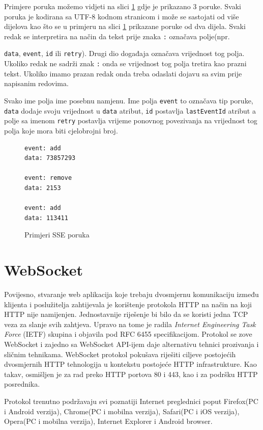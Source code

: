 \documentclass[times, utf8, zavrsni]{fer}
\begin{document}
Primjere poruka možemo vidjeti na slici \ref{lst:sse-messages} gdje je prikazano 3 poruke. Svaki poruka je kodirana sa UTF-8 kodnom stranicom i može se sastojati od više dijelova kao što se u primjeru na slici \ref{lst:sse-messages} prikazane poruke od dva dijela. Svaki redak se interpretira na način da tekst prije znaka {\tt :} označava polje(npr. {{\tt data}, {\tt event}, {\tt id} ili {\tt retry}). Drugi dio događaja označava vrijednost tog polja. Ukoliko redak ne sadrži znak {\tt :} onda se vrijednost tog polja tretira kao prazni tekst. Ukoliko imamo prazan redak onda treba odaslati dojavu sa svim prije napisanim redovima.

Svako ime polja ime posebnu namjenu. Ime polja {\tt event} to označava tip poruke, {\tt data} dodaje svoju vrijednost u {\tt data} atribut, {\tt id} postavlja {\tt lastEventId} atribut a polje sa imenom {\tt retry} postavlja vrijeme ponovnog povezivanja na vrijednost tog polja koje mora biti cjelobrojni broj. 

\begin{figure}
\begin{lstlisting}
event: add
data: 73857293

event: remove
data: 2153

event: add
data: 113411
\end{lstlisting}
\caption{Primjeri SSE poruka}
\label{lst:sse-messages}
\end{figure}

\section{WebSocket}
Povijesno, stvaranje web aplikacija koje trebaju dvosmjernu komunikaciju između klijenta i poslužitelja zahtijevala je korištenje protokola HTTP na način na koji HTTP nije namijenjen. Jednostavnije riješenje bi bilo da se koristi jedna TCP veza za slanje svih zahtjeva. Upravo na tome je radila {\em Internet Engineering Task Force} (IETF) skupina i objavila pod RFC 6455 specifikacijom. Protokol se zove WebSocket i zajedno sa WebSocket API-ijem daje alternativu tehnici prozivanja i sličnim tehnikama. WebSocket protokol pokušava riješiti ciljeve postojećih dvosmjernih HTTP tehnologija u kontekstu postojeće HTTP infrastrukture. Kao takav, osmišljen je za rad preko HTTP portova 80 i 443, kao i za podršku HTTP posrednika.

Protokol trenutno podržavaju svi poznatiji Internet preglednici poput Firefox(PC i Android verzija), Chrome(PC i mobilna verzija), Safari(PC i iOS verzija), Opera(PC i mobilna verzija), Internet Explorer i Android browser.

}
\end{document}
